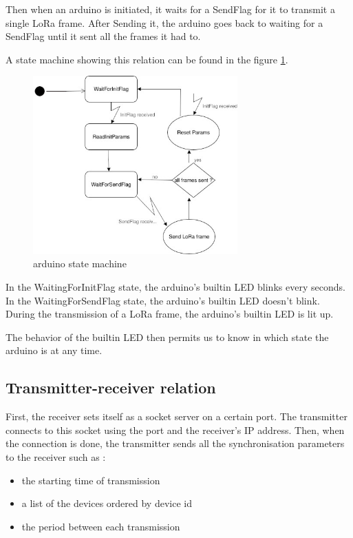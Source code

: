 \documentclass[a4paper, 12pt]{article}
\begin{document}
Then when an arduino is initiated, it waits for a SendFlag for it to transmit a single LoRa frame. After Sending it, the arduino goes back to waiting for a SendFlag until it sent all the frames it had to.

A state machine showing this relation can be found in the figure \ref{ardSM}.

\begin{figure}[H]
  \begin{center}
    \includegraphics[width=0.7\textwidth]{images/arduinoStateMachine.jpg}
  \end{center}
  \caption{arduino state machine}\label{ardSM}
\end{figure}

In the WaitingForInitFlag state, the arduino's builtin LED blinks every seconds.\\
In the WaitingForSendFlag state, the arduino's builtin LED doesn't blink.\\
During the transmission of a LoRa frame, the arduino's builtin LED is lit up.

The behavior of the builtin LED then permits us to know in which state the arduino is at any time.


\subsection{Transmitter-receiver relation}
First, the receiver sets itself as a socket server on a certain port. The transmitter connects to this socket using the port and the receiver's IP address. Then, when the connection is done, the transmitter sends all the synchronisation parameters to the receiver such as : 
\begin{itemize}
  \item the starting time of transmission 
  \item a list of the devices ordered by device id
  \item the period between each transmission
\end{itemize}
\end{document}
